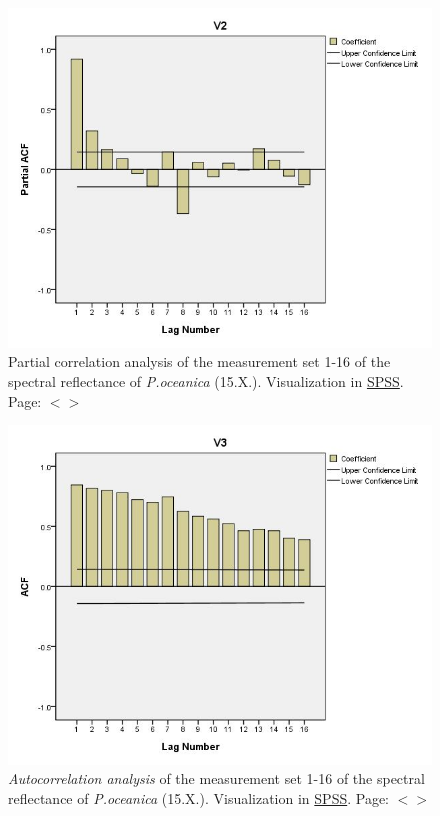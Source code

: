 \documentclass[11pt]{article}
\begin{document}
\begin{appendices}
\begin{figure}[H]
	\includegraphics[scale=0.45]{Partial_Corr.jpg}
	\caption{Partial correlation analysis of the measurement set 1-16 of the spectral reflectance of \textit{P.oceanica} (15.X.). Visualization in \href{http://www.spss.com/}{SPSS}. Page: $<$\pageref{A-24}$>$}
	\label{fig:A.22}
\end{figure}
\begin{figure}[H]
	\centering
	\includegraphics[scale=0.45]{Autocorr.jpg}
	\caption{\textit{Autocorrelation analysis} of the measurement set 1-16 of the spectral reflectance of \textit{P.oceanica} (15.X.). Visualization in \href{http://www.spss.com/}{SPSS}. Page: $<$\pageref{A-23}$>$}
	\label{fig:A.21}
\end{figure}


\end{appendices}
\end{document}
